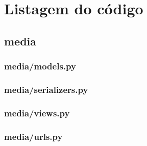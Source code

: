 \newcommand{\codeFolder}{../../tests/django-backbone_0}
                   
\chapter{Listagem do código}
\label{ApendiceA}

\section{media}

%

%

\subsection{media/models.py}


\subsection{media/serializers.py}


\subsection{media/views.py}


\subsection{media/urls.py}


%

